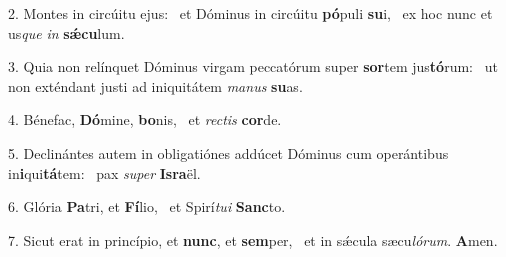 2. Montes in circúitu ejus: \dag\  et Dóminus in circúitu \textbf{pó}puli \textbf{su}i, \ast\  ex hoc nunc et us\textit{que} \textit{in} \textbf{sǽ}\textbf{cu}lum.\

3. Quia non relínquet Dóminus virgam peccatórum super \textbf{sor}tem jus\textbf{tó}rum: \ast\  ut non exténdant justi ad iniquitátem \textit{ma}\textit{nus} \textbf{su}as.\

4. Bénefac, \textbf{Dó}mine, \textbf{bo}nis, \ast\  et \textit{rec}\textit{tis} \textbf{cor}de.\

5. Declinántes autem in obligatiónes addúcet Dóminus cum operántibus in\textbf{i}qui\textbf{tá}tem: \ast\  pax \textit{su}\textit{per} \textbf{Is}\textbf{ra}ël.\

6. Glória \textbf{Pa}tri, et \textbf{Fí}lio, \ast\  et Spirí\textit{tu}\textit{i} \textbf{Sanc}to.\

7. Sicut erat in princípio, et \textbf{nunc}, et \textbf{sem}per, \ast\  et in sǽcula sæcu\textit{ló}\textit{rum}. \textbf{A}men.\


